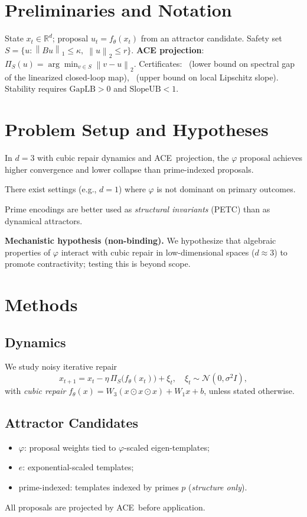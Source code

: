 \documentclass[11pt]{article}
\newcommand{\R}{\mathbb{R}}
\newcommand{\1}{\mathbf{1}}
\newcommand{\norm}[1]{\left\lVert #1 \right\rVert}
\newcommand{\proj}{\Pi}
\newcommand{\gaplb}{\mathrm{GapLB}}
\newcommand{\slopeub}{\mathrm{SlopeUB}}
\newcommand{\phival}{\varphi} %
\newcommand{\ACE}{\textsc{ACE}}
\newcommand{\PETC}{\textsc{PETC}}
\begin{document}
\section{Preliminaries and Notation}
State $x_t\in\R^d$; proposal $u_t=f_\theta(x_t)$ from an attractor candidate. Safety set $S=\{u: \norm{Bu}_1\le\kappa,\;\norm{u}_2\le r\}$. \textbf{ACE projection}: $\proj_S(u)=\arg\min_{v\in S}\norm{v-u}_2$. Certificates: \gaplb\ (lower bound on spectral gap of the linearized closed-loop map), \slopeub\ (upper bound on local Lipschitz slope). Stability requires $\gaplb>0$ and $\slopeub<1$.

\section{Problem Setup and Hypotheses}
\begin{description}[leftmargin=2em,labelsep=0.5em]
  \item[H1 (scoped).] In $d=3$ with cubic repair dynamics and \ACE\ projection, the $\phival$ proposal achieves higher convergence and lower collapse than prime-indexed proposals.
  \item[H2 (falsification).] There exist settings (e.g., $d=1$) where $\phival$ is not dominant on primary outcomes.
  \item[H3 (structure vs. dynamics).] Prime encodings are better used as \emph{structural invariants} (\PETC) than as dynamical attractors.
\end{description}
\textbf{Mechanistic hypothesis (non-binding).} We hypothesize that algebraic properties of $\phival$ interact with cubic repair in low-dimensional spaces ($d\approx3$) to promote contractivity; testing this is beyond scope.

\section{Methods}
\subsection{Dynamics}
We study noisy iterative repair
\begin{equation}
  x_{t+1} = x_t - \eta\, \proj_S\big(f_\theta(x_t)\big) + \xi_t,\quad \xi_t\sim\mathcal{N}(0,\sigma^2 I),
\end{equation}
with \emph{cubic repair} $f_\theta(x)=W_3(x\odot x\odot x)+W_1x+b$, unless stated otherwise.

\subsection{Attractor Candidates}
\begin{itemize}[leftmargin=1.5em]
  \item $\phival$: proposal weights tied to $\phival$-scaled eigen-templates;
  \item $e$: exponential-scaled templates;
  \item prime-indexed: templates indexed by primes $p$ (\emph{structure only}).
\end{itemize}
All proposals are projected by \ACE\ before application.
\end{document}

